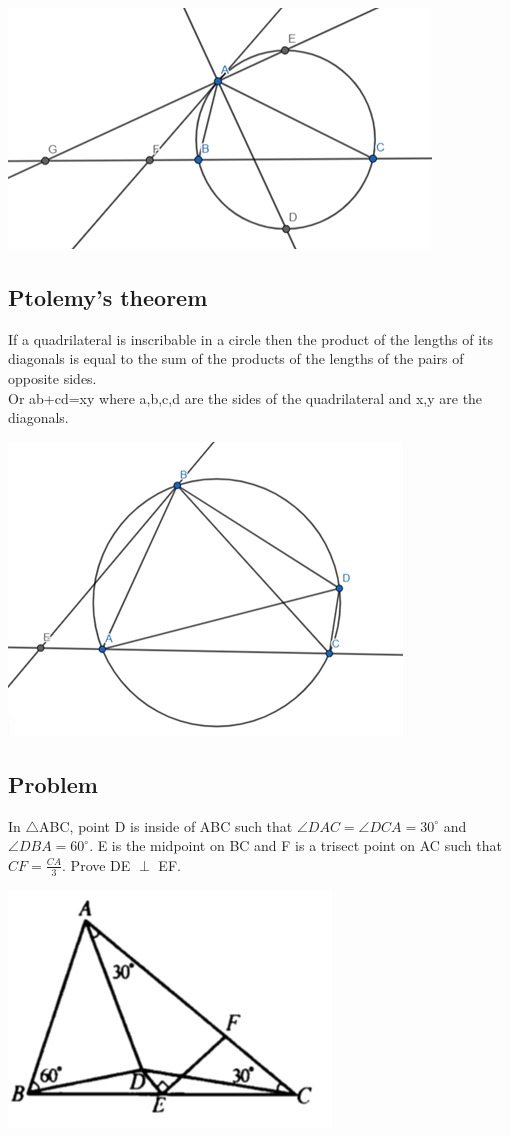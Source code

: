 \documentclass{article}
\begin{document}
\includegraphics{Picture19.png}

\pagebreak

\subsection{Ptolemy's theorem}

If a quadrilateral is inscribable in a circle then the product of the lengths of its diagonals is equal to the sum of the products of the lengths of the pairs of opposite sides.
\\Or ab+cd=xy where a,b,c,d are the sides of the quadrilateral and x,y are the diagonals.

\includegraphics{Picture20.png}

\pagebreak

\subsection{Problem}
In \(\triangle\)ABC, point D is inside of ABC such that \(\angle DAC = \angle DCA=30^{\circ} \) and \(\angle DBA=60^{\circ}\). E is the midpoint on BC and F is a trisect point on AC such that \(CF = \frac{CA}{3} \). Prove DE \(\perp\) EF.

\includegraphics{Picture21.png}
\end{document}
